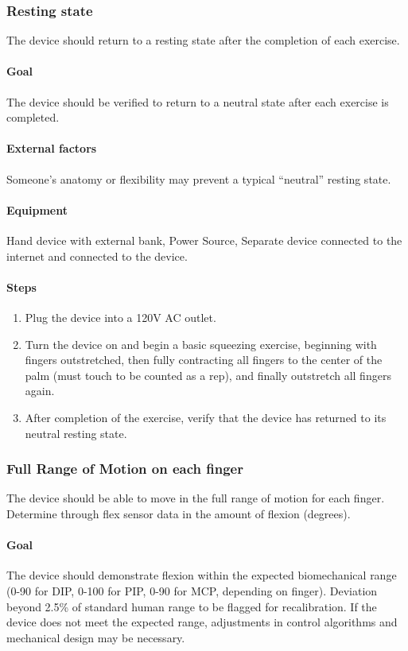 \documentclass{article}
\begin{document}
\subsubsection{Resting state}
The device should return to a resting state after the completion of each exercise.

\paragraph{Goal} The device should be verified to return to a neutral state after each exercise is completed.

\paragraph{External factors} Someone’s anatomy or flexibility may prevent a typical “neutral” resting state.

\paragraph{Equipment} Hand device with external bank, Power Source, Separate device connected to the internet and connected to the device.

\paragraph{Steps}
\begin{enumerate}
\item Plug the device into a 120V AC outlet.
\item Turn the device on and begin a basic squeezing exercise, beginning with fingers outstretched, then fully contracting all fingers to the center of the palm (must touch to be counted as a rep), and finally outstretch all fingers again.
\item After completion of the exercise, verify that the device has returned to its neutral resting state.
\end{enumerate}

\subsubsection{Full Range of Motion on each finger}
The device should be able to move in the full range of motion for each finger. Determine through flex sensor data in the amount of flexion (degrees).

\paragraph{Goal} The device should demonstrate flexion within the expected biomechanical range (0-90 for DIP, 0-100 for PIP, 0-90 for MCP, depending on finger). Deviation beyond 2.5\% of standard human range to be flagged for recalibration. If the device does not meet the expected range, adjustments in control algorithms and mechanical design may be necessary.
\end{document}
